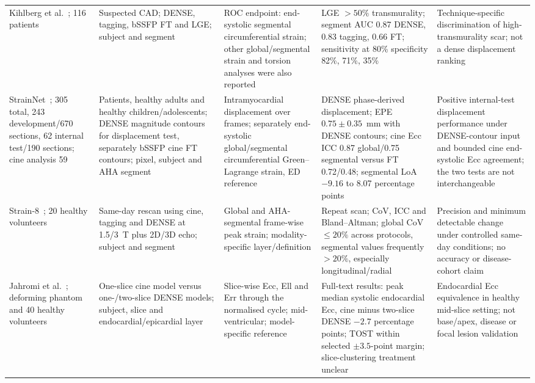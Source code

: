 \documentclass[11pt,a4paper]{article}
\begin{document}
{\begin{longtable}{L{0.12\textwidth}L{0.16\textwidth}L{0.17\textwidth}L{0.20\textwidth}L{0.15\textwidth}}
\addlinespace
Kihlberg et al.~\cite{kihlberg2020clinical}; 116 patients & Suspected CAD; DENSE, tagging, bSSFP FT and LGE; subject and segment & ROC endpoint: end-systolic segmental circumferential strain; other global/segmental strain and torsion analyses were also reported & LGE $>50\%$ transmurality; segment AUC 0.87 DENSE, 0.83 tagging, 0.66 FT; sensitivity at 80\% specificity 82\%, 71\%, 35\% & Technique-specific discrimination of high-transmurality scar; not a dense displacement ranking \\
\addlinespace
StrainNet~\cite{wang2023strainnet}; 305 total, 243 development/670 sections, 62 internal test/190 sections; cine analysis 59 & Patients, healthy adults and healthy children/adolescents; DENSE magnitude contours for displacement test, separately bSSFP cine FT contours; pixel, subject and AHA segment & Intramyocardial displacement over frames; separately end-systolic global/segmental circumferential Green--Lagrange strain, ED reference & DENSE phase-derived displacement; EPE $0.75\pm0.35$~mm with DENSE contours; cine Ecc ICC 0.87 global/0.75 segmental versus FT 0.72/0.48; segmental LoA \(-9.16\) to 8.07 percentage points & Positive internal-test displacement performance under DENSE-contour input and bounded cine end-systolic Ecc agreement; the two tests are not interchangeable \\
\addlinespace
Strain-8~\cite{bell2025strain8}; 20 healthy volunteers & Same-day rescan using cine, tagging and DENSE at 1.5/3~T plus 2D/3D echo; subject and segment & Global and AHA-segmental frame-wise peak strain; modality-specific layer/definition & Repeat scan; CoV, ICC and Bland--Altman; global CoV $\leq20\%$ across protocols, segmental values frequently $>20\%$, especially longitudinal/radial & Precision and minimum detectable change under controlled same-day conditions; no accuracy or disease-cohort claim \\
\addlinespace
Jahromi et al.~\cite{jahromi2026densecine}; deforming phantom and 40 healthy volunteers & One-slice cine model versus one-/two-slice DENSE models; subject, slice and endocardial/epicardial layer & Slice-wise Ecc, Ell and Err through the normalised cycle; mid-ventricular; model-specific reference & Full-text results: peak median systolic endocardial Ecc, cine minus two-slice DENSE \(-2.7\) percentage points; TOST within selected \(\pm3.5\)-point margin; slice-clustering treatment unclear & Endocardial Ecc equivalence in healthy mid-slice setting; not base/apex, disease or focal lesion validation \\
\bottomrule
\end{longtable}
}
\end{document}
